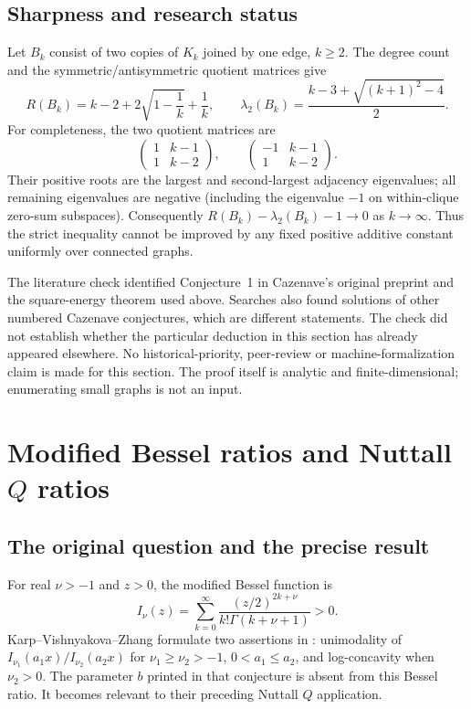 \documentclass[11pt,a4paper]{article}
\theoremstyle{remark}\newtheorem{remark}[theorem]{Remark}
\numberwithin{equation}{section}
\begin{document}
\subsection{Sharpness and research status}
Let $B_k$ consist of two copies of $K_k$ joined by one edge, $k\ge2$.
The degree count and the symmetric/antisymmetric quotient matrices give
\[
 R(B_k)=k-2+2\sqrt{1-\frac1k}+\frac1k,
 \qquad
 \lambda_2(B_k)=\frac{k-3+\sqrt{(k+1)^2-4}}2.
\]
For completeness, the two quotient matrices are
\[
 \begin{pmatrix}1&k-1\\1&k-2\end{pmatrix},\qquad
 \begin{pmatrix}-1&k-1\\1&k-2\end{pmatrix}.
\]
Their positive roots are the largest and second-largest adjacency
eigenvalues; all remaining eigenvalues are negative (including the
eigenvalue $-1$ on within-clique zero-sum subspaces).
Consequently $R(B_k)-\lambda_2(B_k)-1\to0$ as $k\to\infty$.
Thus the strict inequality cannot be improved by any fixed positive
additive constant uniformly over connected graphs.

The literature check identified Conjecture~1 in Cazenave's original
preprint and the square-energy theorem used above. Searches also found
solutions of other numbered Cazenave conjectures, which are different
statements. The check did not establish whether the particular deduction
in this section has already appeared elsewhere. No historical-priority,
peer-review or machine-formalization claim is made for this section.
The proof itself is analytic and finite-dimensional; enumerating small
graphs is not an input.

\section{Modified Bessel ratios and Nuttall \texorpdfstring{$Q$}{Q} ratios}
\label{sec:bessel}
\subsection{The original question and the precise result}
For real $\nu>-1$ and $z>0$, the modified Bessel function is
\begin{equation}\label{bessel-eq:series}
 I_\nu(z)=\sum_{k=0}^{\infty}
 \frac{(z/2)^{2k+\nu}}{k!\Gamma(k+\nu+1)}>0.
\end{equation}
Karp--Vishnyakova--Zhang formulate two assertions in
\cite[Conjecture~1]{bessel-KVZ}: unimodality of
$I_{\nu_1}(a_1x)/I_{\nu_2}(a_2x)$ for
$\nu_1\ge\nu_2>-1$, $0<a_1\le a_2$, and log-concavity when
$\nu_2>0$. The parameter $b$ printed in that conjecture is absent
from this Bessel ratio. It becomes relevant to their preceding
Nuttall $Q$ application.
\end{document}
